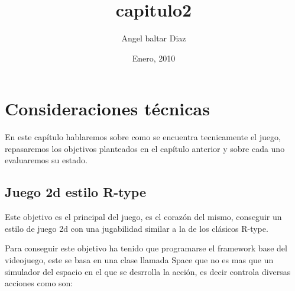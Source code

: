 


\title{capitulo2} 
\author{Angel baltar Diaz}
\date{\Large Enero, 2010} 

\chapter {Consideraciones técnicas}
\label{capitulo2}

En este capítulo hablaremos sobre como se encuentra tecnicamente el juego, repasaremos los objetivos planteados en el capítulo anterior y sobre cada uno evaluaremos su estado.

\section{Juego 2d estilo R-type}

Este objetivo es el principal del juego, es el corazón del mismo, conseguir un estilo de juego 2d con una jugabilidad similar a la de los clásicos R-type.

Para conseguir este objetivo ha tenido que programarse el framework base del videojuego, este se basa en una clase llamada Space que no es mas que un simulador del espacio en el que se desrrolla la acción, es decir controla diversas acciones como son:

